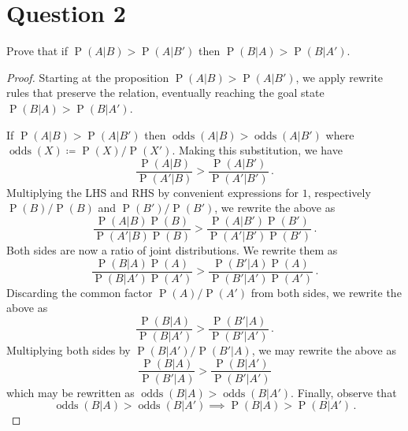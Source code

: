 \documentclass[10pt]{fphw}
\newcommand{\odds}{\operatorname{odds}}
\renewcommand{\Pr}{\operatorname{P}}
\begin{document}
\section*{Question 2}
\begin{problem}
Prove that if $\Pr(A|B) > \Pr(A|B')$ then $\Pr(B|A) > \Pr(B|A')$.
\end{problem}

\begin{proof}
Starting at the proposition $\Pr(A|B) > \Pr(A|B')$, we apply rewrite rules that preserve the relation, eventually reaching the goal state $\Pr(B|A) > \Pr(B|A')$.

If $\Pr(A|B) > \Pr(A|B')$ then $\odds(A|B) > \odds(A|B')$ where $\odds(X) \coloneqq \Pr(X) / \Pr(X')$.
Making this substitution, we have
\begin{equation*}
    \frac{\Pr(A|B)}{\Pr(A'|B)} > \frac{\Pr(A|B')}{\Pr(A'|B')}\,.
\end{equation*}
Multiplying the LHS and RHS by convenient expressions for $1$, respectively  $\Pr(B)/\Pr(B)$ and $\Pr(B')/\Pr(B')$, we rewrite the above as
\begin{equation*}
    \frac{\Pr(A|B)\Pr(B)}{\Pr(A'|B)\Pr(B)} > \frac{\Pr(A|B')\Pr(B')}{\Pr(A'|B')\Pr(B')}\,.
\end{equation*}
Both sides are now a ratio of joint distributions. We rewrite them as
\begin{equation*}
    \frac{\Pr(B|A)\Pr(A)}{\Pr(B|A')\Pr(A')} > \frac{\Pr(B'|A)\Pr(A)}{\Pr(B'|A')\Pr(A')}\,.
\end{equation*}
Discarding the common factor $\Pr(A)/\Pr(A')$ from both sides, we rewrite the above as
\begin{equation*}
    \frac{\Pr(B|A)}{\Pr(B|A')} > \frac{\Pr(B'|A)}{\Pr(B'|A')}\,.
\end{equation*}
Multiplying both sides by $\Pr(B|A')/\Pr(B'|A)$, we may rewrite the above as
\begin{equation*}
    \frac{\Pr(B|A)}{\Pr(B'|A)} > \frac{\Pr(B|A')}{\Pr(B'|A')}
\end{equation*}
which may be rewritten as $\odds(B|A) > \odds(B|A')$. Finally, observe that
\begin{equation*}
    \odds(B|A) > \odds(B|A') \implies \Pr(B|A) > \Pr(B|A')\,.
\end{equation*}
\end{proof}
\end{document}
